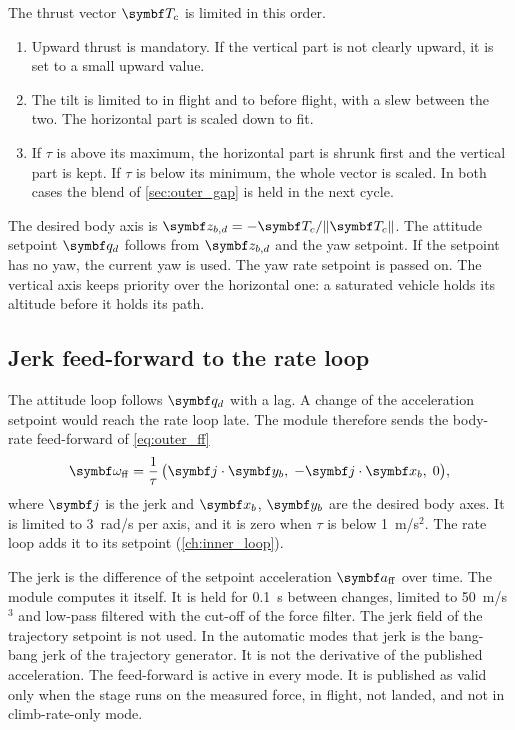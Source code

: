 The thrust vector $\vect T_c$ is limited in this order.
\begin{enumerate}
  \item Upward thrust is mandatory.
    If the vertical part is not clearly upward, it is set to a small upward value.
  \item The tilt is limited to  in flight and to  before flight, with a slew between the two.
    The horizontal part is scaled down to fit.
  \item If $\tau$ is above its maximum, the horizontal part is shrunk first and the vertical part is kept.
    If $\tau$ is below its minimum, the whole vector is scaled.
    In both cases the blend of \cref{sec:outer_gap} is held in the next cycle.
\end{enumerate}
The desired body axis is $\vect z_{b,d} = -\vect T_c/\lVert\vect T_c\rVert$.
The attitude setpoint $\vect q_d$ follows from $\vect z_{b,d}$ and the yaw setpoint.
If the setpoint has no yaw, the current yaw is used.
The yaw rate setpoint is passed on.
The vertical axis keeps priority over the horizontal one: a saturated vehicle holds its altitude before it holds its path.

\subsection{Jerk feed-forward to the rate loop}\label{sec:outer_ff}

The attitude loop follows $\vect q_d$ with a lag.
A change of the acceleration setpoint would reach the rate loop late.
The module therefore sends the body-rate feed-forward of \cref{eq:outer_ff}
\begin{equation}\label{eq:outer_ff}
  \vect\omega_{\mathrm{ff}} = \frac{1}{\tau}\,\bigl(\vect j\cdot\vect y_b,\; -\vect j\cdot\vect x_b,\; 0\bigr) ,
\end{equation}
where $\vect j$ is the jerk and $\vect x_b$, $\vect y_b$ are the desired body axes.
It is limited to 3~rad/s per axis, and it is zero when $\tau$ is below 1~m/s$^2$.
The rate loop adds it to its setpoint (\cref{ch:inner_loop}).

The jerk is the difference of the setpoint acceleration $\vect a_{\mathrm{ff}}$ over time.
The module computes it itself.
It is held for 0.1~s between changes, limited to 50~m/s$^3$ and low-pass filtered with the cut-off of the force filter.
The jerk field of the trajectory setpoint is not used.
In the automatic modes that jerk is the bang-bang jerk of the trajectory generator.
It is not the derivative of the published acceleration.
The feed-forward is active in every mode.
It is published as valid only when the stage runs on the measured force, in flight, not landed, and not in climb-rate-only mode.

